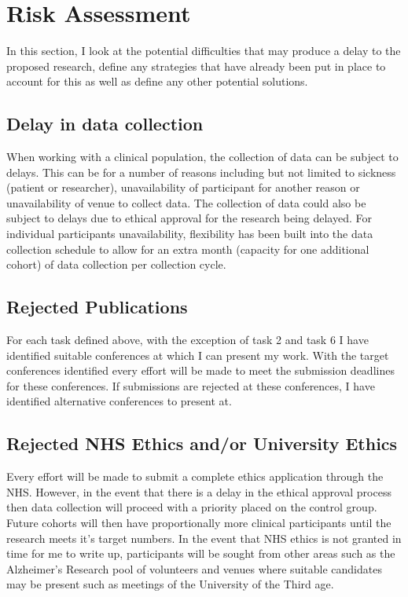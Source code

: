 \documentclass[10pt, letterpaper, twoside, openany]{book}
\begin{document}
\section{Risk Assessment}
In this section, I look at the potential difficulties that may produce a delay to the proposed research, define any strategies that have already been put in place to account for this as well as define any other potential solutions.
\subsection{Delay in data collection}
When working with a clinical population, the collection of data can be subject to delays. This can be for a number of reasons including but not limited to sickness (patient or researcher), unavailability of participant for another reason or unavailability of venue to collect data. The collection of data could also be subject to delays due to ethical approval for the research being delayed. For individual participants unavailability, flexibility has been built into the data collection schedule to allow for an extra month (capacity for one additional cohort) of data collection per collection cycle. 
\subsection{Rejected Publications}
For each task defined above, with the exception of task 2 and task 6 I have identified suitable conferences at which I can present my work. With the target conferences identified every effort will be made to meet the submission deadlines for these conferences. If submissions are rejected at these conferences, I have identified alternative conferences to present at. 
\subsection{Rejected NHS Ethics and/or University Ethics}
Every effort will be made to submit a complete ethics application through the NHS. However, in the event that there is a delay in the ethical approval process then data collection will proceed with a priority placed on the control group. Future cohorts will then have proportionally more clinical participants until the research meets it's target numbers. In the event that NHS ethics is not granted in time for me to write up, participants will be sought from other areas such as the Alzheimer's Research pool of volunteers and venues where suitable candidates may be present such as meetings of the University of the Third age.   
\end{document}
